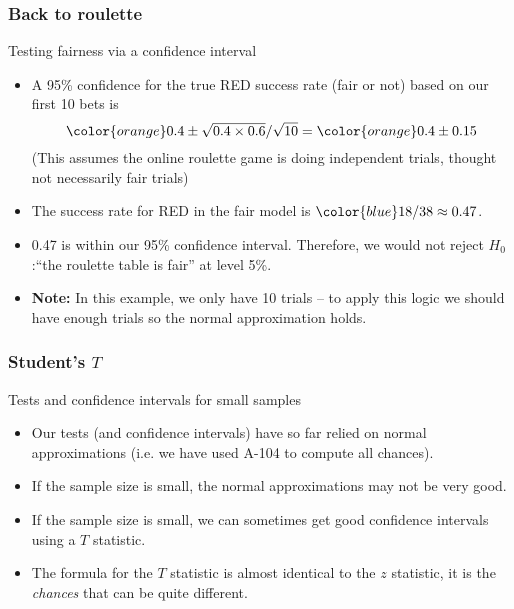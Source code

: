 \documentclass[handout]{beamer}
\begin{document}
   \begin{frame} \frametitle{Back to roulette}

   \begin{block}
   {Testing fairness via a confidence interval}
   \begin{itemize}

   \item A 95\% confidence for the true {\color{red} RED} success rate
   (fair or not)
   based on our first 10 bets is
   $$
   {\color{orange} 0.4 \pm \sqrt{0.4 \times 0.6} / {\sqrt{10}}} =
   {\color{orange} 0.4 \pm 0.15}
   $$
   (This assumes the online roulette game is doing independent trials,
    thought not necessarily fair trials)

   \item The success rate for {\color{red} RED} in the fair model is
   ${\color{blue} 18/38 \approx 0.47}$.

    \item 0.47 is within our 95\% confidence interval. Therefore, we would
    not reject $H_0$:``the roulette table is fair'' at level 5\%.

    \item {\bf Note:} In this example, we only have 10 trials --
    to apply this logic we should have enough trials so the normal
    approximation holds.
   \end{itemize}
   \end{block}
   \end{frame}


   \begin{frame} \frametitle{Student's $T$}

   \begin{block}
   {Tests and confidence intervals for small samples}
   \begin{itemize}

   \item Our tests (and confidence intervals) have so far
   relied on normal approximations  (i.e. we have used A-104 to compute
   all chances).

   \item If the sample size is small, the normal approximations may
   not be very good.

   \item If the sample size is small, we can sometimes get
   good confidence intervals using a $T$ statistic.

   \item The formula for the $T$ statistic is almost identical
   to the $z$ statistic, it is the {\em chances} that can be quite different.

   \end{itemize}
   \end{block}
   \end{frame}
\end{document}
